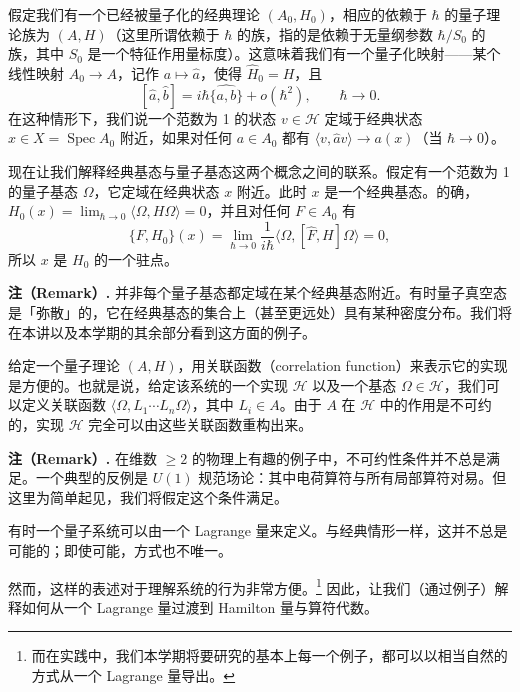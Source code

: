 
假定我们有一个已经被量子化的经典理论 $(A_0,H_0)$，相应的依赖于 $\hbar$ 的量子理论族为 $(A,H)$（这里所谓依赖于 $\hbar$ 的族，指的是依赖于无量纲参数 $\hbar/S_0$ 的族，其中 $S_0$ 是一个特征作用量标度）。这意味着我们有一个量子化映射——某个线性映射 $A_0\to A$，记作 $a\mapsto\widehat{a}$，使得 $\widehat{H}_0=H$，且
\[
[\widehat{a},\widehat{b}]=i\hbar\widehat{\{a,b\}}+o(\hbar^2),\qquad \hbar\to0.
\]
在这种情形下，我们说一个范数为 1 的状态 $v\in\mathcal{H}$ 定域于经典状态 $x\in X=\operatorname{Spec}A_0$ 附近，如果对任何 $a\in A_0$ 都有 $\langle v,\widehat{a}v\rangle\to a(x)$（当 $\hbar\to0$）。

现在让我们解释经典基态与量子基态这两个概念之间的联系。假定有一个范数为 1 的量子基态 $\Omega$，它定域在经典状态 $x$ 附近。此时 $x$ 是一个经典基态。的确，$H_0(x)=\lim_{\hbar\to0}\langle\Omega,H\Omega\rangle=0$，并且对任何 $F\in A_0$ 有
\[
\{F,H_0\}(x)=\lim_{\hbar\to0}\frac{1}{i\hbar}\langle\Omega,[\widehat{F},H]\Omega\rangle=0,
\]
所以 $x$ 是 $H_0$ 的一个驻点。

\textbf{注（Remark）.}
并非每个量子基态都定域在某个经典基态附近。有时量子真空态是「弥散」的，它在经典基态的集合上（甚至更远处）具有某种密度分布。我们将在本讲以及本学期的其余部分看到这方面的例子。

给定一个量子理论 $(A,H)$，用关联函数（correlation function）来表示它的实现是方便的。也就是说，给定该系统的一个实现 $\mathcal{H}$ 以及一个基态 $\Omega\in\mathcal{H}$，我们可以定义关联函数 $\langle\Omega,L_1\cdots L_n\Omega\rangle$，其中 $L_i\in A$。由于 $A$ 在 $\mathcal{H}$ 中的作用是不可约的，实现 $\mathcal{H}$ 完全可以由这些关联函数重构出来。

\textbf{注（Remark）.}
在维数 $\ge2$ 的物理上有趣的例子中，不可约性条件并不总是满足。一个典型的反例是 $U(1)$ 规范场论：其中电荷算符与所有局部算符对易。但这里为简单起见，我们将假定这个条件满足。

有时一个量子系统可以由一个 Lagrange 量来定义。与经典情形一样，这并不总是可能的；即使可能，方式也不唯一。

然而，这样的表述对于理解系统的行为非常方便。\footnote{而在实践中，我们本学期将要研究的基本上每一个例子，都可以以相当自然的方式从一个 Lagrange 量导出。} 因此，让我们（通过例子）解释如何从一个 Lagrange 量过渡到 Hamilton 量与算符代数。

